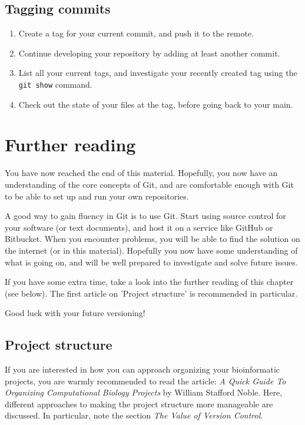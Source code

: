 \documentclass[../main/git_course_main.tex]{subfiles}
\begin{document}
	\subsection{Tagging commits}
	
	\begin{enumerate}
		\item Create a tag for your current commit, and push it to the remote.
		\item Continue developing your repository by adding at least another commit.
		\item List all your current tags, and investigate your recently created tag using the \verb$git show$ command.
		\item Check out the state of your files at the tag, before going back to your main.
	\end{enumerate}
	
	\newpage
	\section{Further reading}
	
	You have now reached the end of this material. Hopefully, you now have an understanding
	of the core concepts of Git, and are comfortable enough with Git to be able to set up and run your own repositories.
	
	A good way to gain fluency in Git is to use Git. Start using source control for your
	software (or text documents), and host it on a service like GitHub or Bitbucket. When you encounter problems, you will be able to find the solution on the internet (or in this material). Hopefully you now have some understanding of what is going on, and will be well prepared to investigate and solve future issues.
	
	If you have some extra time, take a look into the further reading of this chapter (see below).
	The first article on 'Project structure' is recommended in particular.
	
	Good luck with your future versioning!
	
	\subsection{Project structure}
	
	If you are interested in how you can approach
	organizing your bioinformatic projects, you are warmly recommended to read the article: \textit{A Quick Guide To Organizing Computational Biology Projects}
	by William Stafford Noble. Here, different approaches to making the project structure more manageable are discussed. In particular, note the section
	\textit{The Value of Version Control}. \\
	
\end{document}

